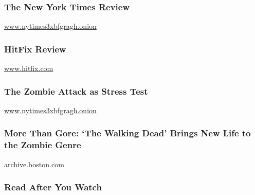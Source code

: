 \hypertarget{the-new-york-times-review}{%
\subsubsection{The New York Times
Review}\label{the-new-york-times-review}}

\href{http://www.nytimes3xbfgragh.onion}{www.nytimes3xbfgragh.onion}

\href{http://www.hitfix.com/blogs/whats-alan-watching/posts/review-amcs-the-walking-dead}{}

\hypertarget{hitfix-review}{%
\subsubsection{HitFix Review}\label{hitfix-review}}

\href{http://www.hitfix.com}{www.hitfix.com}

\href{http://www.nytimes3xbfgragh.onion/2010/10/24/arts/television/24dead.html}{}

\hypertarget{the-zombie-attack-as-stress-test}{%
\subsubsection{The Zombie Attack as Stress
Test}\label{the-zombie-attack-as-stress-test}}

\href{http://www.nytimes3xbfgragh.onion}{www.nytimes3xbfgragh.onion}

\href{http://archive.boston.com/ae/tv/articles/2010/10/29/the_walking_dead_brings_new_life_to_the_zombie_genre/}{}

\hypertarget{more-than-gore-the-walking-dead-brings-new-life-to-the-zombie-genre}{%
\subsubsection{More Than Gore: `The Walking Dead' Brings New Life to the
Zombie
Genre}\label{more-than-gore-the-walking-dead-brings-new-life-to-the-zombie-genre}}

archive.boston.com

\hypertarget{read-after-you-watch}{%
\subsubsection{Read After You Watch}\label{read-after-you-watch}}

\href{http://www.nytimes3xbfgragh.onion/2016/01/07/arts/television/former-walking-dead-producer-blasts-amc.html}{}

